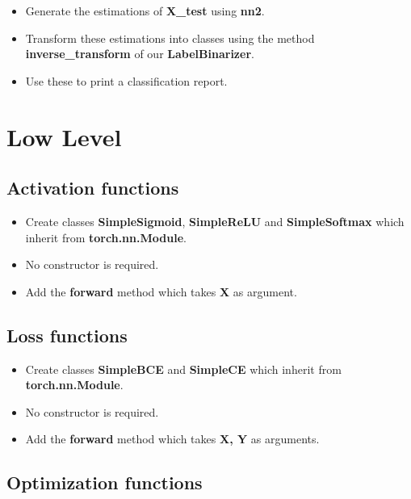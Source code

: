 \documentclass[11pt, a4paper]{article}
\begin{document}
\begin{multicols}{2}
	\begin{itemize}  
		\item Generate the estimations of \textbf{X\_test} using \textbf{nn2}.
		\item Transform these estimations into classes using the method \textbf{inverse\_transform} of our \textbf{LabelBinarizer}.
		\item Use these to print a classification report.
	\end{itemize}
	
	\section{Low Level}
	
	\subsection{Activation functions}
	
	\begin{itemize}  
		\item Create classes \textbf{SimpleSigmoid}, \textbf{SimpleReLU} and \textbf{SimpleSoftmax} which inherit from \textbf{torch.nn.Module}.
		\item No constructor is required. 
		\item Add the \textbf{forward} method which takes \textbf{X} as argument.
	\end{itemize}
	
	\subsection{Loss functions}
	
	\begin{itemize}  
		\item Create classes \textbf{SimpleBCE} and \textbf{SimpleCE} which inherit from \textbf{torch.nn.Module}.
		\item No constructor is required. 
		\item Add the \textbf{forward} method which takes \textbf{X, Y} as arguments.
	\end{itemize}
	
	\subsection{Optimization functions}
	

\end{multicols}
\end{document}
